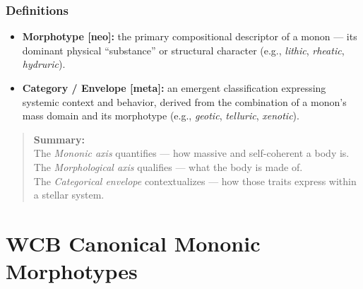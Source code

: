 \documentclass[
  letterpaper,
]{book}
\providecommand{\tightlist}{%
  \setlength{\itemsep}{0pt}\setlength{\parskip}{0pt}}
\begin{document}
\subsection{Definitions}\label{definitions}

\begin{itemize}
\tightlist
\item
  \textbf{Morphotype {[}neo{]}:} the primary compositional descriptor of
  a monon --- its dominant physical ``substance'' or structural
  character (e.g., \emph{lithic}, \emph{rheatic}, \emph{hydruric}).\\
\item
  \textbf{Category / Envelope {[}meta{]}:} an emergent classification
  expressing systemic context and behavior, derived from the combination
  of a monon's mass domain and its morphotype (e.g., \emph{geotic},
  \emph{telluric}, \emph{xenotic}).
\end{itemize}

\begin{quote}
\textbf{Summary:}\\
The \emph{Mononic axis} quantifies --- how massive and self-coherent a
body is.\\
The \emph{Morphological axis} qualifies --- what the body is made of.\\
The \emph{Categorical envelope} contextualizes --- how those traits
express within a stellar system.
\end{quote}

\chapter{WCB Canonical Mononic
Morphotypes}\label{wcb-canonical-mononic-morphotypes}
\end{document}
